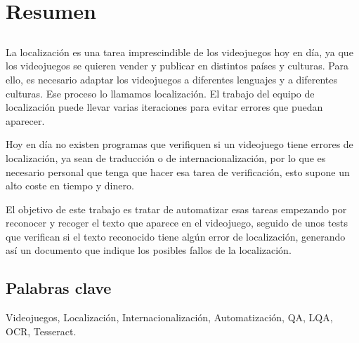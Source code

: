 \chapter*{Resumen}

\section*{\tituloPortadaVal}

La localización es una tarea imprescindible de los videojuegos hoy en día, ya que los videojuegos se quieren vender y publicar en distintos países y culturas. Para ello, es necesario adaptar los videojuegos a diferentes lenguajes y a diferentes culturas. Ese proceso lo llamamos localización. El trabajo del equipo de localización puede llevar varias iteraciones  para evitar errores que puedan aparecer.

Hoy en día no existen programas que verifiquen si un videojuego tiene errores de localización, ya sean de traducción o de internacionalización, por lo que es necesario personal que tenga que hacer esa tarea de verificación, esto supone un alto coste en tiempo y dinero.

El objetivo de este trabajo es tratar de automatizar esas tareas empezando por reconocer y recoger el texto que aparece en el videojuego, seguido de unos tests que verifican si el texto reconocido tiene algún error de localización, generando así un documento que indique los posibles fallos de la localización.



\section*{Palabras clave}
   
\noindent Videojuegos, Localización, Internacionalización, Automatización, QA, LQA, OCR, Tesseract.

   


